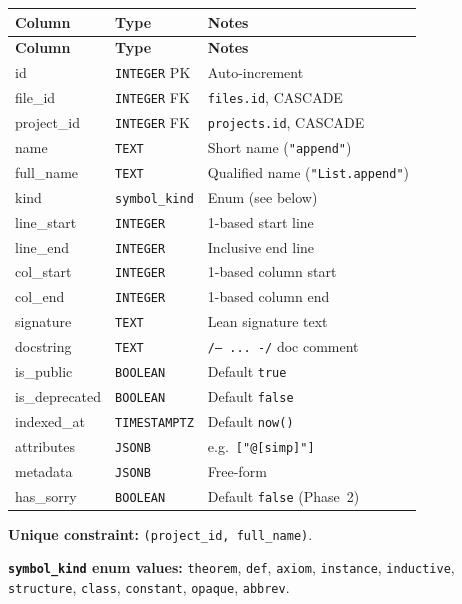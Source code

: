 \begin{longtable}{@{}llp{6cm}@{}}
\toprule
\textbf{Column} & \textbf{Type} & \textbf{Notes} \\
\midrule
\endfirsthead
\toprule
\textbf{Column} & \textbf{Type} & \textbf{Notes} \\
\midrule
\endhead
\bottomrule
\endfoot
id              & \texttt{INTEGER} PK     & Auto-increment \\
file\_id        & \texttt{INTEGER} FK     & \texttt{files.id}, CASCADE \\
project\_id     & \texttt{INTEGER} FK     & \texttt{projects.id}, CASCADE \\
name            & \texttt{TEXT}            & Short name (\texttt{"append"}) \\
full\_name      & \texttt{TEXT}            & Qualified name (\texttt{"List.append"}) \\
kind            & \texttt{symbol\_kind}    & Enum (see below) \\
line\_start     & \texttt{INTEGER}         & 1-based start line \\
line\_end       & \texttt{INTEGER}         & Inclusive end line \\
col\_start      & \texttt{INTEGER}         & 1-based column start \\
col\_end        & \texttt{INTEGER}         & 1-based column end \\
signature       & \texttt{TEXT}            & Lean signature text \\
docstring       & \texttt{TEXT}            & \texttt{/-- ... -/} doc comment \\
is\_public      & \texttt{BOOLEAN}         & Default \texttt{true} \\
is\_deprecated  & \texttt{BOOLEAN}         & Default \texttt{false} \\
indexed\_at     & \texttt{TIMESTAMPTZ}     & Default \texttt{now()} \\
attributes      & \texttt{JSONB}           & e.g.\ \texttt{["@[simp]"]} \\
metadata        & \texttt{JSONB}           & Free-form \\
has\_sorry      & \texttt{BOOLEAN}         & Default \texttt{false} (Phase~2) \\
\end{longtable}

\noindent\textbf{Unique constraint:} \texttt{(project\_id, full\_name)}.

\noindent\textbf{\texttt{symbol\_kind} enum values:}
\texttt{theorem}, \texttt{def}, \texttt{axiom}, \texttt{instance},
\texttt{inductive}, \texttt{structure}, \texttt{class}, \texttt{constant},
\texttt{opaque}, \texttt{abbrev}.

